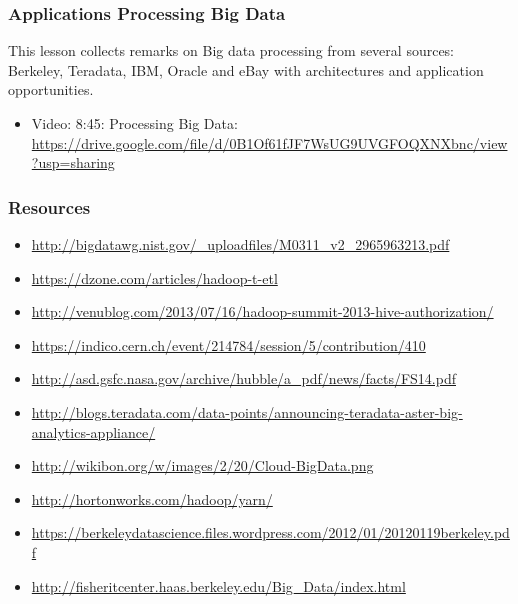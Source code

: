 \subsubsection{Applications Processing Big Data}

This lesson collects remarks on Big data processing from several
sources: Berkeley, Teradata, IBM, Oracle and eBay with architectures and
application opportunities.

\begin{itemize}
\item
  Video: 8:45: Processing Big Data:
  \url{https://drive.google.com/file/d/0B1Of61fJF7WsUG9UVGFOQXNXbnc/view?usp=sharing}
\end{itemize}

\subsubsection{Resources}\label{resources-4}

\begin{itemize}
\item
  \url{http://bigdatawg.nist.gov/_uploadfiles/M0311_v2_2965963213.pdf}
\item
  \url{https://dzone.com/articles/hadoop-t-etl}
\item
  \url{http://venublog.com/2013/07/16/hadoop-summit-2013-hive-authorization/}
\item
  \url{https://indico.cern.ch/event/214784/session/5/contribution/410}
\item
  \url{http://asd.gsfc.nasa.gov/archive/hubble/a_pdf/news/facts/FS14.pdf}
\item
  \url{http://blogs.teradata.com/data-points/announcing-teradata-aster-big-analytics-appliance/}
\item
  \url{http://wikibon.org/w/images/2/20/Cloud-BigData.png}
\item
  \url{http://hortonworks.com/hadoop/yarn/}
\item
  \url{https://berkeleydatascience.files.wordpress.com/2012/01/20120119berkeley.pdf}
\item
  \url{http://fisheritcenter.haas.berkeley.edu/Big_Data/index.html}
\end{itemize}
